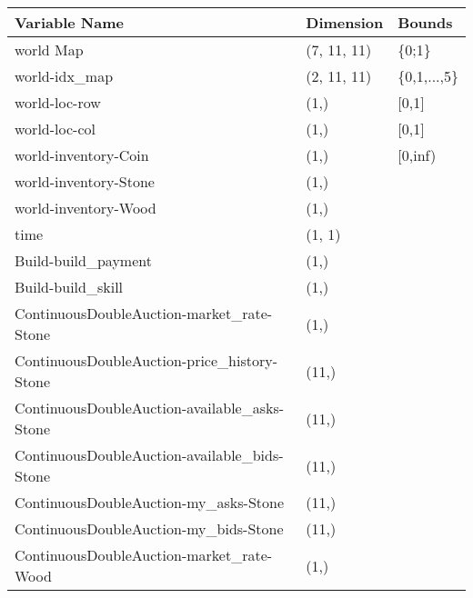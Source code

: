 \begin{table}[]
    \centering
    \begin{tabular}{lll}
    \hline
    Variable Name                                 & Dimension   & Bounds                      \\ \hline
    world Map                                     & (7, 11, 11) & \{0;1\}                     \\ 
    world-idx\_map                                & (2, 11, 11) & \{0,1,...,5\}               \\ 
    world-loc-row                                 & (1,)        & {[}0,1{]}                   \\ 
    world-loc-col                                 & (1,)        & {[}0,1{]}                   \\ 
    world-inventory-Coin                          & (1,)        & {[}0,inf)                   \\ 
    world-inventory-Stone                         & (1,)        &                             \\ 
    world-inventory-Wood                          & (1,)        &                             \\ 
    time                                          & (1, 1)      &                             \\ 
    Build-build\_payment                          & (1,)        &                             \\ 
    Build-build\_skill                            & (1,)        &                             \\ 
    ContinuousDoubleAuction-market\_rate-Stone    & (1,)        &                             \\ 
    ContinuousDoubleAuction-price\_history-Stone  & (11,)       &                             \\ 
    ContinuousDoubleAuction-available\_asks-Stone & (11,)       &                             \\ 
    ContinuousDoubleAuction-available\_bids-Stone & (11,)       &                             \\ 
    ContinuousDoubleAuction-my\_asks-Stone        & (11,)       &                             \\ 
    ContinuousDoubleAuction-my\_bids-Stone        & (11,)       &                             \\ 
    ContinuousDoubleAuction-market\_rate-Wood     & (1,)        &                             \\ 

\end{tabular}
\end{table}
